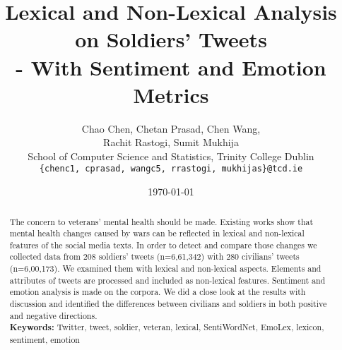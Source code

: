 \documentclass[english,a4paper,11pt]{article}
\title{Lexical and Non-Lexical Analysis on Soldiers' Tweets\\- With Sentiment and Emotion Metrics}
\date{\today}
\author{
  Chao Chen, Chetan Prasad, Chen Wang, \\
  Rachit Rastogi, Sumit Mukhija \\
  School of Computer Science and Statistics, Trinity College Dublin\\
  \texttt{\{chenc1, cprasad, wangc5, rrastogi, mukhijas\}@tcd.ie}
}
\begin{document}
\maketitle
\thispagestyle{empty}
\pagestyle{empty}

\begin{abstract}
  The concern to veterans' mental health should be made. Existing works show that mental health changes caused by wars can be reflected in lexical and non-lexical features of the social media texts. In order to detect and compare those changes we collected data from 208 soldiers' tweets (n=6,61,342) with 280 civilians' tweets (n=6,00,173). We examined them with lexical and non-lexical aspects. Elements and attributes of tweets are processed and included as non-lexical features. Sentiment and emotion analysis is made on the corpora. We did a close look at the results with discussion and identified the differences between civilians and soldiers in both positive and negative directions. \\
  \textbf{Keywords:} Twitter, tweet, soldier, veteran, lexical, SentiWordNet, EmoLex, lexicon, sentiment, emotion
\end{abstract}








\clearpage



\end{document}
